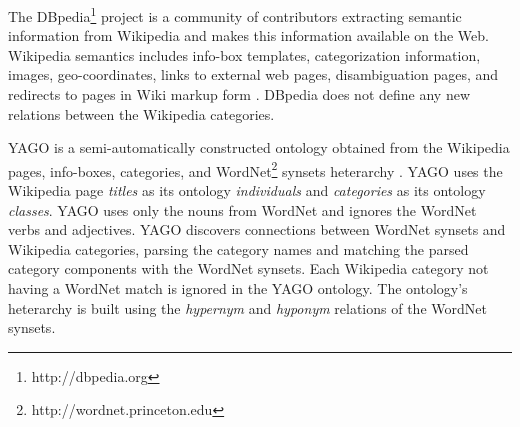 

The DBpedia\footnote{http://dbpedia.org} project is a community of contributors extracting semantic information from Wikipedia and makes this information available on the Web. Wikipedia semantics includes info-box templates, categorization information,  images, geo-coordinates, links to external web pages, disambiguation pages, and redirects to pages in Wiki markup form \cite{Bizer2009}.  DBpedia does not define any new relations between the Wikipedia categories.  


YAGO is a semi-automatically constructed ontology obtained from the Wikipedia pages, info-boxes, categories, and WordNet\footnote{http://wordnet.princeton.edu} synsets heterarchy \cite{Suchanek2009phd}. YAGO uses the Wikipedia page \emph{titles} as its ontology \emph{individuals} and \emph{categories} as its ontology \emph{classes}. YAGO uses only the nouns from WordNet and ignores the WordNet verbs and adjectives.  YAGO discovers connections between WordNet synsets and Wikipedia categories, parsing the category names and matching the parsed category components with the WordNet synsets. Each Wikipedia category not having a WordNet match is ignored in the YAGO ontology.  The ontology's heterarchy is built using the \textit{hypernym} and \textit{hyponym} relations of the WordNet synsets.  

